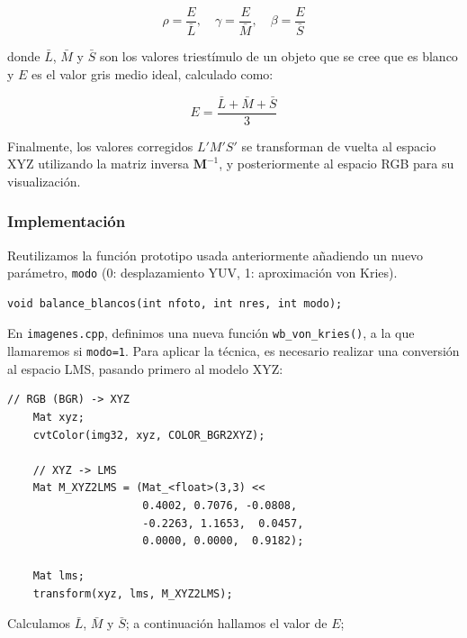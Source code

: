 \documentclass[11pt]{article}
\begin{document}
          \[ \rho = \frac{E}{\bar{L}}, \quad \gamma = \frac{E}{\bar{M}}, \quad \beta = \frac{E}{\bar{S}} \]

          \noindent
          donde \(\bar{L}\), \(\bar{M}\) y \(\bar{S}\) son los valores triestímulo de un objeto que se cree que es blanco y \(E\) es el valor gris medio ideal, calculado como:

          \[ E = \frac{\bar{L} + \bar{M} + \bar{S}}{3} \]

          Finalmente, los valores corregidos \(L'M'S'\) se transforman de vuelta al
          espacio XYZ utilizando la matriz inversa \(\mathbf{M}^{-1}\), y posteriormente
          al espacio RGB para su visualización.

      \subsubsection{Implementación}

          \noindent
          Reutilizamos la función prototipo usada anteriormente añadiendo un nuevo parámetro, \texttt{modo} (0: desplazamiento YUV, 1: aproximación von Kries).

          \begin{lstlisting}[style=CppQtStyle, caption={Prototipo de \texttt{balance\_blancos(int nfoto, int nres, int modo)}.}]
    void balance_blancos(int nfoto, int nres, int modo);
\end{lstlisting}

          En \texttt{imagenes.cpp}, definimos una nueva función
          \texttt{wb\_von\_kries()}, a la que llamaremos si \texttt{modo=1}. Para aplicar
          la técnica, es necesario realizar una conversión al espacio LMS, pasando
          primero al modelo XYZ:

          \begin{lstlisting}[style=CppQtStyle, caption={Conversión RGB (BGR) -> XYZ y definición de \texttt{M\_XYZ2LMS}.}]
    // RGB (BGR) -> XYZ
    Mat xyz;
    cvtColor(img32, xyz, COLOR_BGR2XYZ);

    // XYZ -> LMS
    Mat M_XYZ2LMS = (Mat_<float>(3,3) <<
                     0.4002, 0.7076, -0.0808,
                     -0.2263, 1.1653,  0.0457,
                     0.0000, 0.0000,  0.9182);

    Mat lms;
    transform(xyz, lms, M_XYZ2LMS);
\end{lstlisting}

          \noindent
          Calculamos \(\bar{L}\), \(\bar{M}\) y \(\bar{S}\); a continuación hallamos el valor de \(E\);
\end{document}
